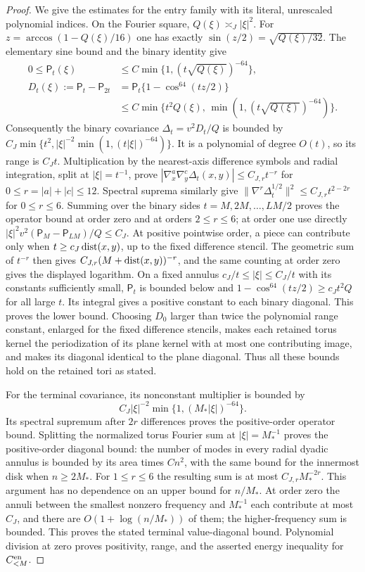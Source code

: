 \begin{proof}
We give the estimates for the entry family with its literal,
unrescaled polynomial indices.  On the Fourier square,
$Q(\xi)\asymp_J|\xi|^2$.  For
$z=\arccos(1-Q(\xi)/16)$ one has exactly
$\sin(z/2)=\sqrt{Q(\xi)/32}$.  The elementary sine bound and the
binary identity give
\[
 \begin{split}
 0\le\mathsf P_t(\xi)&\le C\min\{1,(t\sqrt{Q(\xi)})^{-64}\},\\
 D_t(\xi):=\mathsf P_t-\mathsf P_{2t}
 &=\mathsf P_t\{1-\cos^{64}(tz/2)\}\\
 &\le C\min\{t^2Q(\xi),\,\min(1,(t\sqrt{Q(\xi)})^{-64})\}.
 \end{split}
\]
Consequently the binary covariance
$\Delta_t=v^2D_t/Q$ is bounded by
$C_J\min\{t^2,|\xi|^{-2}\min(1,(t|\xi|)^{-64})\}$.
It is a polynomial of degree $O(t)$, so its range is $C_Jt$.
Multiplication by the nearest-axis difference symbols and radial
integration, split at $|\xi|=t^{-1}$, prove
$|\nabla_x^a\nabla_y^c\Delta_t(x,y)|\le C_{J,r}t^{-r}$
for $0\le r=|a|+|c|\le12$.  Spectral suprema similarly give
$\|\nabla^r\Delta_t^{1/2}\|^2\le C_{J,r}t^{2-2r}$ for $0\le r\le6$.
Summing over the binary sides $t=M,2M,\ldots,LM/2$ proves the
operator bound at order zero and at orders $2\le r\le6$; at order one
use directly
$|\xi|^2v^2(\mathsf P_M-\mathsf P_{LM})/Q\le C_J$.
At positive pointwise order, a piece can contribute only when
$t\ge c_J\operatorname{dist}(x,y)$, up to the fixed difference stencil.
The geometric sum of $t^{-r}$ then gives
$C_{J,r}(M+\operatorname{dist}(x,y))^{-r}$, and the same counting at order
zero gives the displayed logarithm.  On a fixed annulus
$c_J/t\le|\xi|\le C_J/t$ with its constants sufficiently small,
$\mathsf P_t$ is bounded below and
$1-\cos^{64}(tz/2)\ge c_Jt^2Q$ for all large $t$.
Its integral gives a positive constant to each binary diagonal.
This proves the lower bound.  Choosing $D_0$ larger than twice the
polynomial range constant, enlarged for the fixed difference stencils,
makes each retained torus kernel the
periodization of its plane kernel with at most one contributing
image, and makes its diagonal identical to the plane diagonal.
Thus all these bounds hold on the retained tori as stated.

For the terminal covariance, its nonconstant multiplier is bounded by
\[
 C_J|\xi|^{-2}\min\{1,(M_*|\xi|)^{-64}\}.
\]
Its spectral supremum after $2r$ differences proves the positive-order operator
bound.  Splitting the normalized torus Fourier sum at
$|\xi|=M_*^{-1}$ proves the positive-order diagonal bound:
the number of modes in every radial dyadic annulus is bounded by
its area times $Cn^2$, with the same bound for the innermost disk
when $n\ge2M_*$.  For $1\le r\le6$ the resulting sum is at most
$C_{J,r}M_*^{-2r}$.  This argument has no dependence on an upper
bound for $n/M_*$.  At order zero the annuli between the smallest
nonzero frequency and $M_*^{-1}$ each contribute at most $C_J$,
and there are $O(1+\log(n/M_*))$ of them; the higher-frequency
sum is bounded.  This proves the stated terminal value-diagonal
bound.  Polynomial division at zero proves positivity,
range, and the asserted energy inequality for $C^{\rm en}_{<M}$.


\end{proof}
